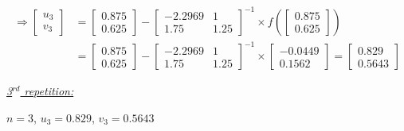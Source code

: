 \documentclass[a4paper,11pt]{article}
\begin{document}
\[ \begin{array}{ll}
    \Rightarrow  \begin{bmatrix} u_{3} \\ v_{3} \end{bmatrix} &= \begin{bmatrix} 0.875 \\ 0.625  \end{bmatrix} - \begin{bmatrix} -2.2969 & 1  \\ 1.75 & 1.25  \end{bmatrix}^{-1} \times f\left(\begin{bmatrix} 0.875 \\ 0.625 \end{bmatrix}\right) \\
    &= \begin{bmatrix} 0.875 \\ 0.625  \end{bmatrix} - \begin{bmatrix} -2.2969 & 1  \\ 1.75 & 1.25  \end{bmatrix}^{-1} \times \begin{bmatrix} -0.0449 \\ 0.1562 \end{bmatrix} = \begin{bmatrix} 0.829 \\ 0.5643 \end{bmatrix} 
\end{array} \]


\underline{\textit{3$^{rd}$ repetition:}}

$n = 3$, $u_3 = 0.829$, $v_3 = 0.5643$
\end{document}
